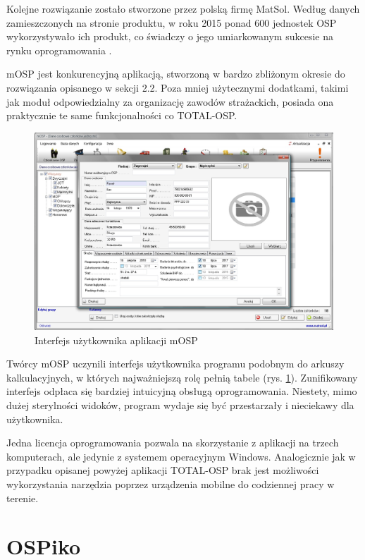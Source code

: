 Kolejne rozwiązanie zostało stworzone przez polską firmę MatSol. Według danych zamieszczonych na stronie produktu, w roku 2015 ponad 600 jednostek OSP wykorzystywało ich produkt, co świadczy o jego umiarkowanym sukcesie na rynku oprogramowania \cite{mOSP}.

mOSP jest konkurencyjną aplikacją, stworzoną w bardzo zbliżonym okresie do rozwiązania opisanego w sekcji 2.2. Poza mniej użytecznymi dodatkami, takimi jak moduł odpowiedzialny za organizację zawodów strażackich, posiada ona praktycznie te same funkcjonalności co TOTAL-OSP.

\begin{figure}
    \centering
    \includegraphics[width=\textwidth]{img/chapter2/m-osp.jpg}
    \caption{Interfejs użytkownika aplikacji mOSP}
    \label{fig:mOSP}
\end{figure}

Twórcy mOSP uczynili interfejs użytkownika programu podobnym do arkuszy kalkulacyjnych, w których najważniejszą rolę pełnią tabele (rys. \ref{fig:mOSP}). Zunifikowany interfejs odpłaca się bardziej intuicyjną obsługą oprogramowania. Niestety, mimo dużej sterylności widoków, program wydaje się być przestarzały i nieciekawy dla użytkownika.

Jedna licencja oprogramowania pozwala na skorzystanie z aplikacji na trzech komputerach, ale jedynie z systemem operacyjnym Windows. Analogicznie jak w przypadku opisanej powyżej aplikacji TOTAL-OSP brak jest możliwości wykorzystania narzędzia poprzez urządzenia mobilne do codziennej pracy w terenie. 

\section{OSPiko}

